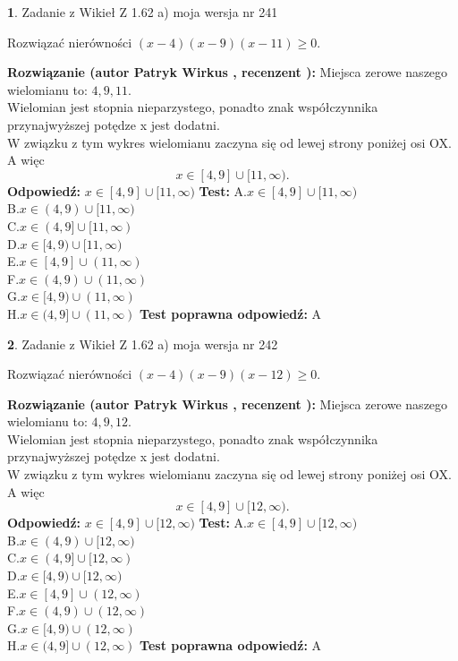 \documentclass[12pt, a4paper]{article}
\theoremstyle{definition} %
\newtheorem{zad}{}
\newcommand{\zadStart}[1]{\begin{zad}#1\newline}
\newcommand{\zadStop}{\end{zad}}
\newcommand{\rozwStart}[2]{\noindent \textbf{Rozwiązanie (autor #1 , recenzent #2): }\newline}
\newcommand{\rozwStop}{\newline}
\newcommand{\odpStart}{\noindent \textbf{Odpowiedź:}\newline}
\newcommand{\odpStop}{\newline}
\newcommand{\testStart}{\noindent \textbf{Test:}\newline}
\newcommand{\testStop}{\newline}
\newcommand{\kluczStart}{\noindent \textbf{Test poprawna odpowiedź:}\newline}
\newcommand{\kluczStop}{\newline}
\begin{document}
\zadStart{Zadanie z Wikieł Z 1.62 a) moja wersja nr 241}

Rozwiązać nierówności $(x-4)(x-9)(x-11)\ge0$.
\zadStop
\rozwStart{Patryk Wirkus}{}
Miejsca zerowe naszego wielomianu to: $4, 9, 11$.\\
Wielomian jest stopnia nieparzystego, ponadto znak współczynnika przy\linebreak najwyższej potędze x jest dodatni.\\ W związku z tym wykres wielomianu zaczyna się od lewej strony poniżej osi OX. A więc $$x \in [4,9] \cup [11,\infty).$$
\rozwStop
\odpStart
$x \in [4,9] \cup [11,\infty)$
\odpStop
\testStart
A.$x \in [4,9] \cup [11,\infty)$\\
B.$x \in (4,9) \cup [11,\infty)$\\
C.$x \in (4,9] \cup [11,\infty)$\\
D.$x \in [4,9) \cup [11,\infty)$\\
E.$x \in [4,9] \cup (11,\infty)$\\
F.$x \in (4,9) \cup (11,\infty)$\\
G.$x \in [4,9) \cup (11,\infty)$\\
H.$x \in (4,9] \cup (11,\infty)$
\testStop
\kluczStart
A
\kluczStop



\zadStart{Zadanie z Wikieł Z 1.62 a) moja wersja nr 242}

Rozwiązać nierówności $(x-4)(x-9)(x-12)\ge0$.
\zadStop
\rozwStart{Patryk Wirkus}{}
Miejsca zerowe naszego wielomianu to: $4, 9, 12$.\\
Wielomian jest stopnia nieparzystego, ponadto znak współczynnika przy\linebreak najwyższej potędze x jest dodatni.\\ W związku z tym wykres wielomianu zaczyna się od lewej strony poniżej osi OX. A więc $$x \in [4,9] \cup [12,\infty).$$
\rozwStop
\odpStart
$x \in [4,9] \cup [12,\infty)$
\odpStop
\testStart
A.$x \in [4,9] \cup [12,\infty)$\\
B.$x \in (4,9) \cup [12,\infty)$\\
C.$x \in (4,9] \cup [12,\infty)$\\
D.$x \in [4,9) \cup [12,\infty)$\\
E.$x \in [4,9] \cup (12,\infty)$\\
F.$x \in (4,9) \cup (12,\infty)$\\
G.$x \in [4,9) \cup (12,\infty)$\\
H.$x \in (4,9] \cup (12,\infty)$
\testStop
\kluczStart
A
\kluczStop
\end{document}
